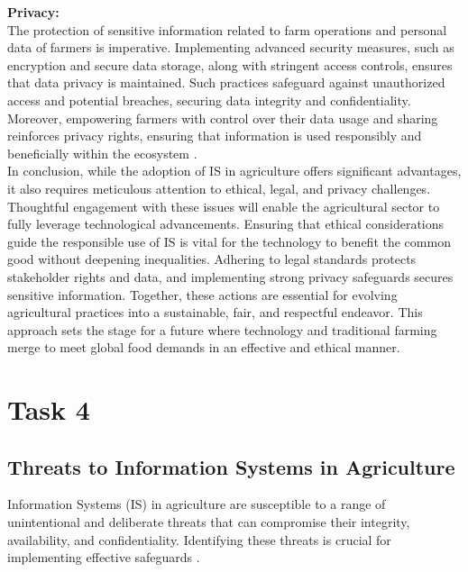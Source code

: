 \documentclass[12pt,a4paper]{article}
\begin{document}
\noindent \textbf{Privacy:} \\The protection of sensitive information related to farm operations and personal data of farmers is imperative. Implementing advanced security measures, such as encryption and secure data storage, along with stringent access controls, ensures that data privacy is maintained. Such practices safeguard against unauthorized access and potential breaches, securing data integrity and confidentiality. Moreover, empowering farmers with control over their data usage and sharing reinforces privacy rights, ensuring that information is used responsibly and beneficially within the ecosystem \citep{Ref_7}.\\


\noindent In conclusion, while the adoption of IS in agriculture offers significant advantages, it also requires meticulous attention to ethical, legal, and privacy challenges. Thoughtful engagement with these issues will enable the agricultural sector to fully leverage technological advancements. Ensuring that ethical considerations guide the responsible use of IS is vital for the technology to benefit the common good without deepening inequalities. Adhering to legal standards protects stakeholder rights and data, and implementing strong privacy safeguards secures sensitive information. Together, these actions are essential for evolving agricultural practices into a sustainable, fair, and respectful endeavor. This approach sets the stage for a future where technology and traditional farming merge to meet global food demands in an effective and ethical manner.
\pagebreak

\setcounter{page}{6}
\section{Task 4}
\subsection{Threats to Information Systems in Agriculture}
\label{sec:Task 4}

\noindent Information Systems (IS) in agriculture are susceptible to a range of unintentional and deliberate threats that can compromise their integrity, availability, and confidentiality. Identifying these threats is crucial for implementing effective safeguards \citep{Ref_8}.\\
\end{document}
